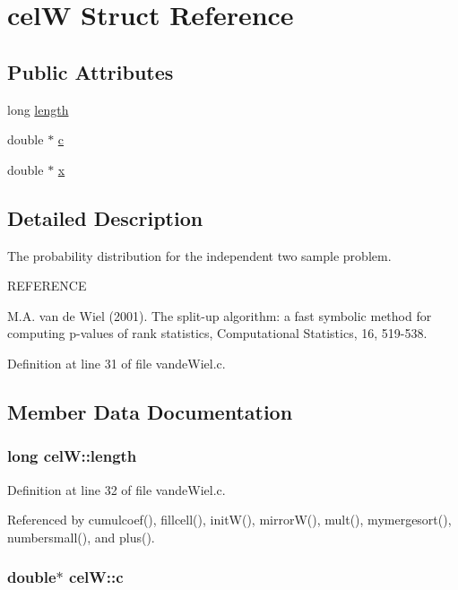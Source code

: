 \hypertarget{structcelW}{
\section{celW Struct Reference}
\label{structcelW}
}
\subsection*{Public Attributes}
\begin{CompactItemize}
\item 
long \hyperlink{structcelW_47b173a5f8c56a051237cac49ddbef4f}{length}
\item 
double $\ast$ \hyperlink{structcelW_f8a631c01b9310cf542171f4df975499}{c}
\item 
double $\ast$ \hyperlink{structcelW_b443b2a7120f170c2c5e8012f4dd86d7}{x}
\end{CompactItemize}


\subsection{Detailed Description}
The probability distribution for the independent two sample problem.

REFERENCE

M.A. van de Wiel (2001). The split-up algorithm: a fast symbolic method for computing p-values of rank statistics, Computational Statistics, 16, 519-538. 

Definition at line 31 of file vandeWiel.c.

\subsection{Member Data Documentation}
\hypertarget{structcelW_47b173a5f8c56a051237cac49ddbef4f}{
\subsubsection{\setlength{\rightskip}{0pt plus 5cm}long {\bf celW::length}}}
\label{structcelW_47b173a5f8c56a051237cac49ddbef4f}




Definition at line 32 of file vandeWiel.c.

Referenced by cumulcoef(), fillcell(), initW(), mirrorW(), mult(), mymergesort(), numbersmall(), and plus().\hypertarget{structcelW_f8a631c01b9310cf542171f4df975499}{
\subsubsection{\setlength{\rightskip}{0pt plus 5cm}double$\ast$ {\bf celW::c}}}
\label{structcelW_f8a631c01b9310cf542171f4df975499}




